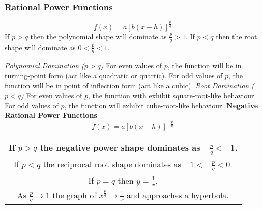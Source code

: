 \documentclass{article}
\begin{document}
			\subsubsection{Rational Power Functions}
				\[f(x)=a[b(x-h)]^\frac{p}{q}\]
				If $p > q$ then the polynomial shape will dominate as $\frac{p}{q}>1$.\newline
				If $p < q$ then the root shape will dominate as $0<\frac{p}{q}<1$.
				\begin{center}
				\end{center}
				\textit{Polynomial Domination ($p > q$)} \newline
				For even values of $p$, the function will be in turning-point form (act like a quadratic or quartic). For odd values of $p$, the function will be in point of inflection form (act like a cubic).
				\newline\newline
				\textit{Root Domination ($p < q$)} \newline
				For even values of $p$, the function with exhibit square-root-like behaviour. For odd values of $p$, the function will exhibit cube-root-like behaviour.\newline\newline
				\textbf{Negative Rational Power Functions}
				\[f(x)=a[b(x-h)]^{-\frac{p}{q}}\]
				\begin{center}
					\bgroup
					\def\arraystretch{1.5}
					\begin{tabular}{|c|}
						\hline
						If $p > q$ the negative power shape dominates as $-\frac{p}{q}<-1$.\\
						\hline
						If $p < q$ the reciprocal root shape dominates as $-1<-\frac{p}{q}<0$.\\
						\hline
						If $p = q$ then $y=\frac{1}{x}$.\\
						\hline
						As $\frac{p}{q}\to1$ the graph of $x^\frac{p}{q}\to\frac{1}{x}$ and approaches a hyperbola.\\
						\hline
					\end{tabular}
					\egroup
				\end{center}
\end{document}

